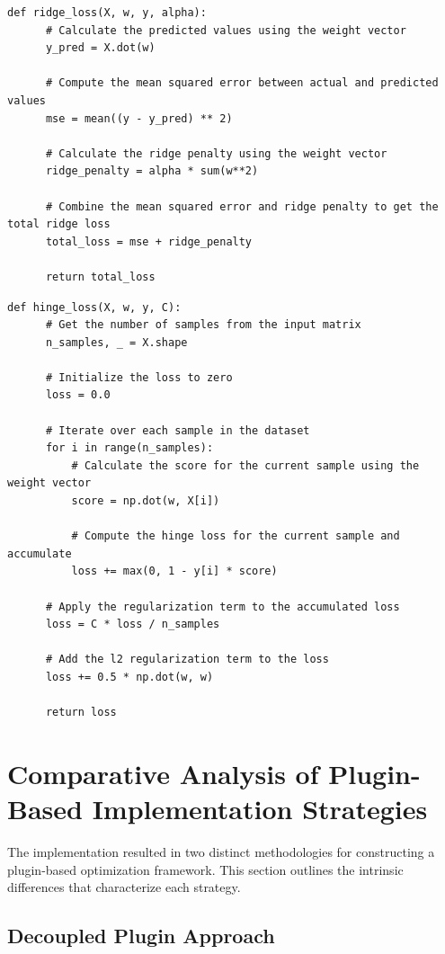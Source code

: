 \documentclass[
  a4paper,  %
  twoside,  %
  bibliography=totoc,
  headsepline,
  cleardoublepage=empty,
  parskip=half,
  draft=false
]{scrbook}
\begin{document}
\begin{lstlisting}[caption={Ridge Loss Calculation}, label=alg:ridge_loss]
  def ridge_loss(X, w, y, alpha):
      # Calculate the predicted values using the weight vector
      y_pred = X.dot(w)

      # Compute the mean squared error between actual and predicted values
      mse = mean((y - y_pred) ** 2)

      # Calculate the ridge penalty using the weight vector
      ridge_penalty = alpha * sum(w**2)

      # Combine the mean squared error and ridge penalty to get the total ridge loss
      total_loss = mse + ridge_penalty

      return total_loss
\end{lstlisting}

\begin{lstlisting}[caption={Hinge Loss Calculation}, label=alg:hinge_loss]
  def hinge_loss(X, w, y, C):
      # Get the number of samples from the input matrix
      n_samples, _ = X.shape

      # Initialize the loss to zero
      loss = 0.0

      # Iterate over each sample in the dataset
      for i in range(n_samples):
          # Calculate the score for the current sample using the weight vector
          score = np.dot(w, X[i])

          # Compute the hinge loss for the current sample and accumulate
          loss += max(0, 1 - y[i] * score)

      # Apply the regularization term to the accumulated loss
      loss = C * loss / n_samples

      # Add the l2 regularization term to the loss
      loss += 0.5 * np.dot(w, w)

      return loss
\end{lstlisting}

\section{Comparative Analysis of Plugin-Based Implementation Strategies}
\label{sec:differencesBetweenTheTwoPluginBasedImplementationApproaches}

The implementation resulted in two distinct methodologies for constructing a plugin-based optimization framework.
This section outlines the intrinsic differences that characterize each strategy.

\subsection{Decoupled Plugin Approach}
\label{sec:firstApproach}
\end{document}
